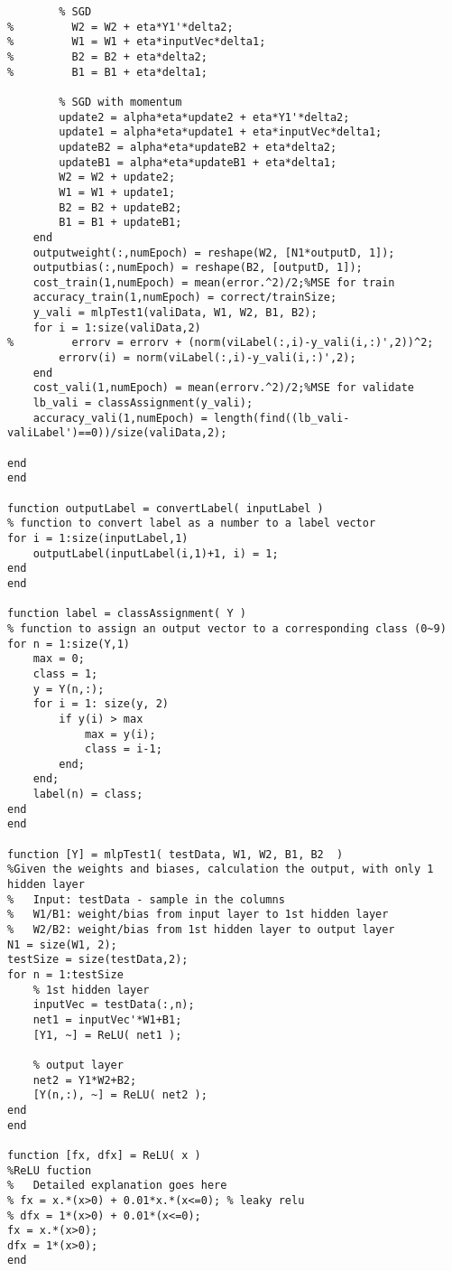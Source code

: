 \documentclass[a4paper]{article}
\begin{document}
\begin{spacing}{2.0}
\begin{lstlisting}
        % SGD
%         W2 = W2 + eta*Y1'*delta2;
%         W1 = W1 + eta*inputVec*delta1;
%         B2 = B2 + eta*delta2;
%         B1 = B1 + eta*delta1;

        % SGD with momentum
        update2 = alpha*eta*update2 + eta*Y1'*delta2;
        update1 = alpha*eta*update1 + eta*inputVec*delta1;
        updateB2 = alpha*eta*updateB2 + eta*delta2;
        updateB1 = alpha*eta*updateB1 + eta*delta1;
        W2 = W2 + update2;
        W1 = W1 + update1;
        B2 = B2 + updateB2;
        B1 = B1 + updateB1;
    end
    outputweight(:,numEpoch) = reshape(W2, [N1*outputD, 1]);
    outputbias(:,numEpoch) = reshape(B2, [outputD, 1]);
    cost_train(1,numEpoch) = mean(error.^2)/2;%MSE for train
    accuracy_train(1,numEpoch) = correct/trainSize;
    y_vali = mlpTest1(valiData, W1, W2, B1, B2);
    for i = 1:size(valiData,2)
%         errorv = errorv + (norm(viLabel(:,i)-y_vali(i,:)',2))^2;
        errorv(i) = norm(viLabel(:,i)-y_vali(i,:)',2);
    end
    cost_vali(1,numEpoch) = mean(errorv.^2)/2;%MSE for validate
    lb_vali = classAssignment(y_vali);
    accuracy_vali(1,numEpoch) = length(find((lb_vali-valiLabel')==0))/size(valiData,2);
        
end
end

function outputLabel = convertLabel( inputLabel )
% function to convert label as a number to a label vector  
for i = 1:size(inputLabel,1)
    outputLabel(inputLabel(i,1)+1, i) = 1;
end
end
    
function label = classAssignment( Y )
% function to assign an output vector to a corresponding class (0~9)
for n = 1:size(Y,1)
    max = 0;
    class = 1;
    y = Y(n,:);
    for i = 1: size(y, 2)
        if y(i) > max
            max = y(i);
            class = i-1;
        end;
    end;
    label(n) = class;
end
end
    
function [Y] = mlpTest1( testData, W1, W2, B1, B2  )
%Given the weights and biases, calculation the output, with only 1 hidden layer
%   Input: testData - sample in the columns
%   W1/B1: weight/bias from input layer to 1st hidden layer
%   W2/B2: weight/bias from 1st hidden layer to output layer
N1 = size(W1, 2);
testSize = size(testData,2);
for n = 1:testSize
	% 1st hidden layer
    inputVec = testData(:,n);
    net1 = inputVec'*W1+B1;
	[Y1, ~] = ReLU( net1 );
    
	% output layer
	net2 = Y1*W2+B2;
	[Y(n,:), ~] = ReLU( net2 );
end
end
    
function [fx, dfx] = ReLU( x )
%ReLU fuction
%   Detailed explanation goes here
% fx = x.*(x>0) + 0.01*x.*(x<=0); % leaky relu
% dfx = 1*(x>0) + 0.01*(x<=0);
fx = x.*(x>0);
dfx = 1*(x>0);
end

\end{lstlisting}

\end{spacing}
\end{document}
